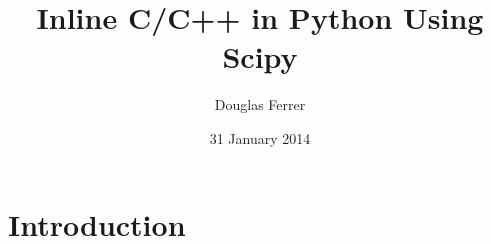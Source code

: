\documentclass{article}
\begin{document}
\title{Inline C/C++ in Python Using Scipy} \author{Douglas Ferrer} \date{31 January 2014}

\maketitle

\section{Introduction}
\end{document}

